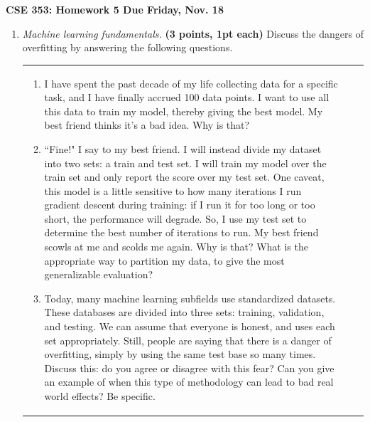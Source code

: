 \documentclass{article}
\newcommand{\mypagebreak}{\begin{center}
		\noindent\makebox[\linewidth]{\rule{7.5in}{1pt}}
	\end{center}}
\newcommand{\showpoints}[1]{\textbf{(#1)}}
\begin{document}
{\Large\textbf{CSE 353: Homework 5 \hfill
Due Friday, Nov. 18}}


\mypagebreak



\begin{enumerate}

\item \emph{Machine learning fundamentals.} \showpoints{3 points, 1pt each} Discuss the dangers of overfitting by answering the following questions.

\begin{tabular}[t]{lll}
\begin{minipage}{.7\linewidth}
\begin{enumerate}

\item I have spent the past decade of my life collecting data for a specific task, and I have finally accrued 100 data points. I want to use all this data to train my model, thereby giving the best model. My best friend thinks it's a bad idea. Why is that?




\item ``Fine!" I say to my best friend. I will instead divide my dataset into two sets: a train and test set. I will train my model over the train set and only report the score over my test set. One caveat, this model is a little sensitive to how many iterations I run gradient descent during training: if I run it for too long or too short, the performance will degrade. So, I use my test set to determine the best number of iterations to run. My best friend scowls at me and scolds me again. Why is that? What is the appropriate way to partition my data, to give the most generalizable evaluation?





\item Today, many machine learning subfields use standardized datasets. These databases are divided into three sets: training, validation, and testing. We can assume that everyone is honest, and uses each set appropriately. Still, people are saying that there is a danger of overfitting, simply by using the same test base so many times. Discuss this: do you agree or disagree with this fear? Can you give an example of when this type of methodology can lead to bad real world effects? Be specific.




\end{enumerate}
\end{minipage}
\end{tabular}
\end{enumerate}
\end{document}
